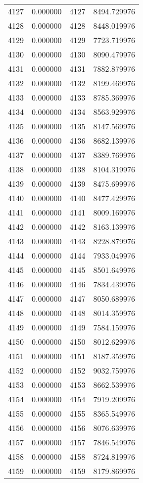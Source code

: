 \documentclass[12pt]{article}
\begin{document}
\begin{longtable}{@{}cccc@{}}
4127 & 0.000000 & 4127 & 8494.729976 \\
4128 & 0.000000 & 4128 & 8448.019976 \\
4129 & 0.000000 & 4129 & 7723.719976 \\
4130 & 0.000000 & 4130 & 8090.479976 \\
4131 & 0.000000 & 4131 & 7882.879976 \\
4132 & 0.000000 & 4132 & 8199.469976 \\
4133 & 0.000000 & 4133 & 8785.369976 \\
4134 & 0.000000 & 4134 & 8563.929976 \\
4135 & 0.000000 & 4135 & 8147.569976 \\
4136 & 0.000000 & 4136 & 8682.139976 \\
4137 & 0.000000 & 4137 & 8389.769976 \\
4138 & 0.000000 & 4138 & 8104.319976 \\
4139 & 0.000000 & 4139 & 8475.699976 \\
4140 & 0.000000 & 4140 & 8477.429976 \\
4141 & 0.000000 & 4141 & 8009.169976 \\
4142 & 0.000000 & 4142 & 8163.139976 \\
4143 & 0.000000 & 4143 & 8228.879976 \\
4144 & 0.000000 & 4144 & 7933.049976 \\
4145 & 0.000000 & 4145 & 8501.649976 \\
4146 & 0.000000 & 4146 & 7834.439976 \\
4147 & 0.000000 & 4147 & 8050.689976 \\
4148 & 0.000000 & 4148 & 8014.359976 \\
4149 & 0.000000 & 4149 & 7584.159976 \\
4150 & 0.000000 & 4150 & 8012.629976 \\
4151 & 0.000000 & 4151 & 8187.359976 \\
4152 & 0.000000 & 4152 & 9032.759976 \\
4153 & 0.000000 & 4153 & 8662.539976 \\
4154 & 0.000000 & 4154 & 7919.209976 \\
4155 & 0.000000 & 4155 & 8365.549976 \\
4156 & 0.000000 & 4156 & 8076.639976 \\
4157 & 0.000000 & 4157 & 7846.549976 \\
4158 & 0.000000 & 4158 & 8724.819976 \\
4159 & 0.000000 & 4159 & 8179.869976 \\

\end{longtable}
\end{document}
